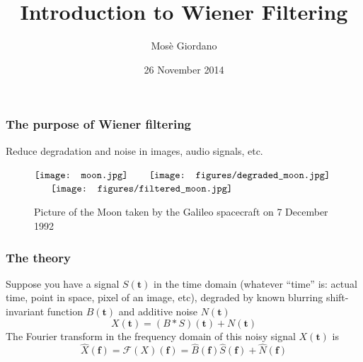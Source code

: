 \documentclass[10pt]{beamer}
\title{Introduction to Wiener Filtering}
\author{Mosè Giordano}
\date{26 November 2014}
\institute[UniSalento and INFN Lecce]{Università del Salento and INFN Lecce}
\begin{document}
\begin{frame}[plain]
  \maketitle
\end{frame}

\begin{frame}
  \frametitle{The purpose of Wiener filtering}
  Reduce degradation and noise in images, audio signals, etc.
  \begin{figure}
    \centering
    \(\vcenter{\hbox{\texttt{[image: moon.jpg]}}}\) ~
     ~
    \(\vcenter{\hbox{\texttt{[image: figures/degraded\_moon.jpg]}}}\)
    ~
     ~
    \(\vcenter{\hbox{\texttt{[image: figures/filtered\_moon.jpg]}}}\)
    \caption{Picture of the Moon taken by the Galileo spacecraft on 7 December 1992}
  \end{figure}
\end{frame}

\begin{frame}
  \frametitle{The theory}
  Suppose you have a \alert{signal} \(S(\bm{t})\) in the time domain (whatever
  ``time'' is: actual time, point in space, pixel of an image, etc), degraded by
  \alert{known blurring shift-invariant function} \(B(\bm{t})\) and
  \alert{additive noise} \(N(\bm{t})\)
  \begin{equation*}
    X(\bm{t}) = (B * S)(\bm{t}) + N(\bm{t})
  \end{equation*}
  The Fourier transform in the frequency domain of this \alert{noisy signal}
  \(X(\bm{t})\) is
  \begin{equation*}
    \hat{X}(\bm{f}) = \mathcal{F}(X)(\bm{f}) = \hat{B}(\bm{f})\hat{S}(\bm{f}) +
    \hat{N}(\bm{f})
  \end{equation*}
\end{frame}
\end{document}

